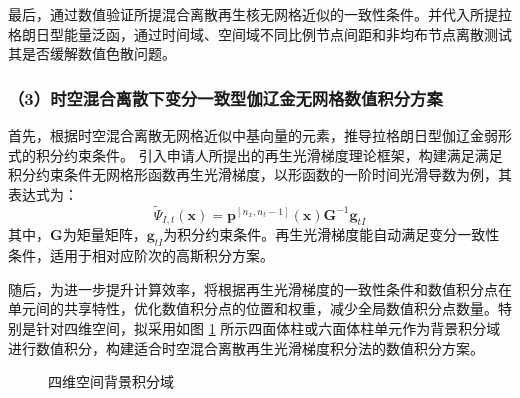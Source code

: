 
最后，通过数值验证所提混合离散再生核无网格近似的一致性条件。并代入所提拉格朗日型能量泛函，通过时间域、空间域不同比例节点间距和非均布节点离散测试其是否缓解数值色散问题。

\subsubsection*{\bfseries （3）时空混合离散下变分一致型伽辽金无网格数值积分方案}
首先，根据时空混合离散无网格近似中基向量的元素，推导拉格朗日型伽辽金弱形式的积分约束条件。
引入申请人所提出的再生光滑梯度理论框架，构建满足满足积分约束条件无网格形函数再生光滑梯度，以形函数的一阶时间光滑导数为例，其表达式为：
\begin{equation}
    \tilde \Psi_{I,t}(\boldsymbol x) = \boldsymbol p^{[n_x,n_t - 1]}(\boldsymbol x) \boldsymbol G^{ - 1} \boldsymbol g_{tI}
\end{equation}
其中，$\boldsymbol G$为矩量矩阵，$\boldsymbol g_{tI}$为积分约束条件。再生光滑梯度能自动满足变分一致性条件，适用于相对应阶次的高斯积分方案。

随后，为进一步提升计算效率，将根据再生光滑梯度的一致性条件和数值积分点在单元间的共享特性，优化数值积分点的位置和权重，减少全局数值积分点数量。特别是针对四维空间，拟采用如图 \ref{fg:domain} 所示四面体柱或六面体柱单元作为背景积分域进行数值积分，构建适合时空混合离散再生光滑梯度积分法的数值积分方案。

\begin{figure}[!h]
    \centering 
    \hspace{24pt}
    \caption{四维空间背景积分域}
    \label{fg:domain}
\end{figure}

